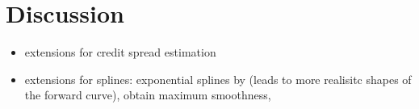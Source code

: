 \clearpage
\section{Discussion}

\begin{itemize}
\item extensions for credit spread estimation \cite{Jankowitsch2004, Geyer2004}
\item extensions for splines: exponential splines by \cite{Vasicek1982} (leads to more realisitc shapes of the forward curve), \cite{Adams1994} obtain maximum smoothness, \cite{Fisher1995, Waggoner1997, Anderson1999 }
\end{itemize}